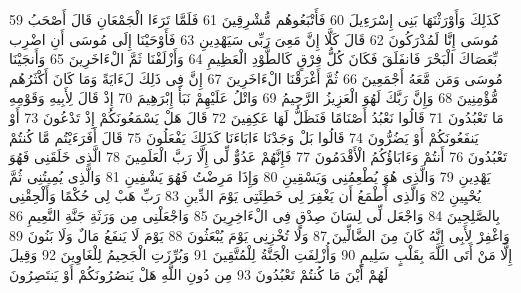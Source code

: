 \documentclass[20pt,a4paper]{article}
\begin{document}
{\tiny\colorbox{cl_aya}{59}} كَذَلِكَ وَأَوْرَثْنَهَا بَنِى إِسْرَءِيلَ
{\tiny\colorbox{cl_aya}{60}} فَأَتْبَعُوهُم مُّشْرِقِينَ
{\tiny\colorbox{cl_aya}{61}} فَلَمَّا تَرَءَا الْجَمْعَانِ قَالَ أَصْحَبُ مُوسَى إِنَّا لَمُدْرَكُونَ
{\tiny\colorbox{cl_aya}{62}} قَالَ كَلَّا إِنَّ مَعِىَ رَبِّى سَيَهْدِينِ
{\tiny\colorbox{cl_aya}{63}} فَأَوْحَيْنَا إِلَى مُوسَى أَنِ اضْرِب بِّعَصَاكَ الْبَحْرَ فَانفَلَقَ فَكَانَ كُلُّ فِرْقٍ كَالطَّوْدِ الْعَظِيمِ
{\tiny\colorbox{cl_aya}{64}} وَأَزْلَفْنَا ثَمَّ الْءَاخَرِينَ
{\tiny\colorbox{cl_aya}{65}} وَأَنجَيْنَا مُوسَى وَمَن مَّعَهُ أَجْمَعِينَ
{\tiny\colorbox{cl_aya}{66}} ثُمَّ أَغْرَقْنَا الْءَاخَرِينَ
{\tiny\colorbox{cl_aya}{67}} إِنَّ فِى ذَلِكَ لَءَايَةً وَمَا كَانَ أَكْثَرُهُم مُّؤْمِنِينَ
{\tiny\colorbox{cl_aya}{68}} وَإِنَّ رَبَّكَ لَهُوَ الْعَزِيزُ الرَّحِيمُ
{\tiny\colorbox{cl_aya}{69}} وَاتْلُ عَلَيْهِمْ نَبَأَ إِبْرَهِيمَ
{\tiny\colorbox{cl_aya}{70}} إِذْ قَالَ لِأَبِيهِ وَقَوْمِهِ مَا تَعْبُدُونَ
{\tiny\colorbox{cl_aya}{71}} قَالُوا نَعْبُدُ أَصْنَامًا فَنَظَلُّ لَهَا عَكِفِينَ
{\tiny\colorbox{cl_aya}{72}} قَالَ هَلْ يَسْمَعُونَكُمْ إِذْ تَدْعُونَ
{\tiny\colorbox{cl_aya}{73}} أَوْ يَنفَعُونَكُمْ أَوْ يَضُرُّونَ
{\tiny\colorbox{cl_aya}{74}} قَالُوا بَلْ وَجَدْنَا ءَابَاءَنَا كَذَلِكَ يَفْعَلُونَ
{\tiny\colorbox{cl_aya}{75}} قَالَ أَفَرَءَيْتُم مَّا كُنتُمْ تَعْبُدُونَ
{\tiny\colorbox{cl_aya}{76}} أَنتُمْ وَءَابَاؤُكُمُ الْأَقْدَمُونَ
{\tiny\colorbox{cl_aya}{77}} فَإِنَّهُمْ عَدُوٌّ لِّى إِلَّا رَبَّ الْعَلَمِينَ
{\tiny\colorbox{cl_aya}{78}} الَّذِى خَلَقَنِى فَهُوَ يَهْدِينِ
{\tiny\colorbox{cl_aya}{79}} وَالَّذِى هُوَ يُطْعِمُنِى وَيَسْقِينِ
{\tiny\colorbox{cl_aya}{80}} وَإِذَا مَرِضْتُ فَهُوَ يَشْفِينِ
{\tiny\colorbox{cl_aya}{81}} وَالَّذِى يُمِيتُنِى ثُمَّ يُحْيِينِ
{\tiny\colorbox{cl_aya}{82}} وَالَّذِى أَطْمَعُ أَن يَغْفِرَ لِى خَطِئَتِى يَوْمَ الدِّينِ
{\tiny\colorbox{cl_aya}{83}} رَبِّ هَبْ لِى حُكْمًا وَأَلْحِقْنِى بِالصَّلِحِينَ
{\tiny\colorbox{cl_aya}{84}} وَاجْعَل لِّى لِسَانَ صِدْقٍ فِى الْءَاخِرِينَ
{\tiny\colorbox{cl_aya}{85}} وَاجْعَلْنِى مِن وَرَثَةِ جَنَّةِ النَّعِيمِ
{\tiny\colorbox{cl_aya}{86}} وَاغْفِرْ لِأَبِى إِنَّهُ كَانَ مِنَ الضَّالِّينَ
{\tiny\colorbox{cl_aya}{87}} وَلَا تُخْزِنِى يَوْمَ يُبْعَثُونَ
{\tiny\colorbox{cl_aya}{88}} يَوْمَ لَا يَنفَعُ مَالٌ وَلَا بَنُونَ
{\tiny\colorbox{cl_aya}{89}} إِلَّا مَنْ أَتَى اللَّهَ بِقَلْبٍ سَلِيمٍ
{\tiny\colorbox{cl_aya}{90}} وَأُزْلِفَتِ الْجَنَّةُ لِلْمُتَّقِينَ
{\tiny\colorbox{cl_aya}{91}} وَبُرِّزَتِ الْجَحِيمُ لِلْغَاوِينَ
{\tiny\colorbox{cl_aya}{92}} وَقِيلَ لَهُمْ أَيْنَ مَا كُنتُمْ تَعْبُدُونَ
{\tiny\colorbox{cl_aya}{93}} مِن دُونِ اللَّهِ هَلْ يَنصُرُونَكُمْ أَوْ يَنتَصِرُونَ
\end{document}
